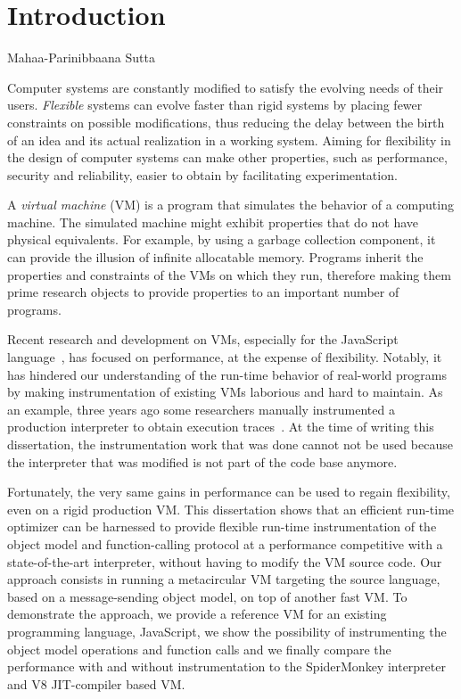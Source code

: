 \chapter{Introduction}

{Mahaa-Parinibbaana Sutta \cite{1988last}}

Computer systems are constantly modified to satisfy the evolving needs of their
users. \textit{Flexible} systems can evolve faster than rigid systems by
placing fewer constraints on possible modifications, thus reducing the delay
between the birth of an idea and its actual realization in a working system.
Aiming for flexibility in the design of computer systems can make other
properties, such as performance, security and reliability, easier to obtain by
facilitating experimentation.

A \textit{virtual machine} (VM) is a program that simulates the behavior of a
computing machine.  The simulated machine might exhibit properties that do not
have physical equivalents. For example, by using a garbage collection
component, it can provide the illusion of infinite allocatable memory. Programs
inherit the properties and constraints of the VMs on which they run, therefore
making them prime research objects to provide properties to an important number
of programs.

Recent research and development on VMs, especially for the JavaScript
language~\cite{js_spec}, has focused on performance, at the expense of
flexibility. Notably, it has hindered our understanding of the run-time
behavior of real-world programs by making instrumentation of existing VMs
laborious and hard to maintain. As an example, three years ago some researchers
manually instrumented a production interpreter to obtain execution
traces~\cite{behavior_js}. At the time of writing this dissertation, the
instrumentation work that was done cannot not be used because the
interpreter that was modified is not part of the code base anymore.

Fortunately, the very same gains in performance can be used to regain
flexibility, even on a rigid production VM. This dissertation shows that an
efficient run-time optimizer can be harnessed to provide flexible run-time
instrumentation of the object model and function-calling protocol at a
performance competitive with a state-of-the-art interpreter, without having to
modify the VM source code. Our approach consists in running a metacircular VM
targeting the source language, based on a message-sending object model, on top
of another fast VM. To demonstrate the approach, we provide a reference VM for
an existing programming language, JavaScript, we show the possibility of
instrumenting the object model operations and function calls and we finally
compare the performance with and without instrumentation to the SpiderMonkey
interpreter and V8 JIT-compiler based VM. 

